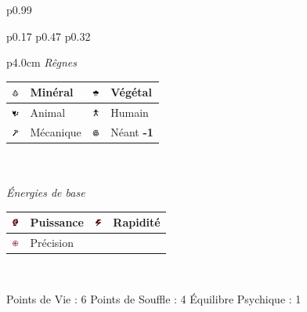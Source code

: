 \documentclass[11pt,twoside,a4paper]{article}
\def\imgMINER{\includegraphics[width=0.25cm]{../../../../../imgGraphics/rolePlayingGame/SimulacreS/mini12x12/mineral.png} }
\def\imgVEGET{\includegraphics[width=0.25cm]{../../../../../imgGraphics/rolePlayingGame/SimulacreS/mini12x12/vegetal.png} }
\def\imgANIMA{\includegraphics[width=0.25cm]{../../../../../imgGraphics/rolePlayingGame/SimulacreS/mini12x12/animal.png} }
\def\imgHUMAI{\includegraphics[width=0.25cm]{../../../../../imgGraphics/rolePlayingGame/SimulacreS/mini12x12/humain.png} }
\def\imgMECAN{\includegraphics[width=0.25cm]{../../../../../imgGraphics/rolePlayingGame/SimulacreS/mini12x12/mecanique.png} }
\def\imgNEANT{\includegraphics[width=0.25cm]{../../../../../imgGraphics/rolePlayingGame/SimulacreS/mini12x12/neant.png} }
\def\imgPUISS{\includegraphics[width=0.25cm]{../../../../../imgGraphics/rolePlayingGame/SimulacreS/mini12x12/puissance.png} }
\def\imgRAPID{\includegraphics[width=0.25cm]{../../../../../imgGraphics/rolePlayingGame/SimulacreS/mini12x12/rapidite.png} }
\def\imgPRECI{\includegraphics[width=0.25cm]{../../../../../imgGraphics/rolePlayingGame/SimulacreS/mini12x12/precision.png} }
\begin{document}
\begin{longtable}[ht]{ p{} }
\begin{tabular}[h]{ p{} p{} p{} }
			\begin{tabular}[h]{ p{4.0cm} }
				\emph{R{\^e}gnes}  \\
				{\footnotesize %
				\begin{tabular}[h]{|p{0.25cm}|p{1.50cm}|p{0.25cm}|p{1.50cm}|}
					\hline
					\imgMINER 	& Min{\'e}ral		\newline 1	 & \imgVEGET	& V{\'e}g{\'e}tal		\newline 0					\\
					\hline
					\imgANIMA 	& Animal			\newline 0	 & \imgHUMAI	& Humain				\newline 1					\\
					\hline
					\imgMECAN	& M{\'e}canique		\newline 2	 & \imgNEANT	& N{\'e}ant				\newline \textbf{-1}		\\ 
					\hline
				\end{tabular} } \\
				\\
				\emph{{\'E}nergies de base} \\
				{\footnotesize %
				\begin{tabular}[h]{|p{0.25cm}|p{1.50cm}|p{0.25cm}|p{1.50cm}|}
					\hline
					\imgPUISS	& Puissance			\newline 0	 & \imgRAPID	& Rapidit{\'e}			\newline 2				\\
					\hline
					\imgPRECI	& Pr{\'e}cision		\newline 1	 &				&												\\
					\hline
				\end{tabular} } \\
			\end{tabular}
			\newline \newline \newline 
			Points de Vie : 6			\newline
			Points de Souffle : 4		\newline
			{\'E}quilibre Psychique : 1	\newline
		\\ %

\end{tabular}
\end{longtable}
\end{document}
